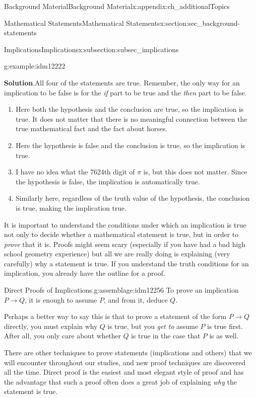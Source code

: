 \documentclass[oneside,10pt,]{book}
\numberwithin{equation}{chapter}
\def\imp{\rightarrow}
\begin{document}
\begin{appendixptx}{Background Material}{}{Background Material}{}{}{x:appendix:ch_additionalTopics}
\begin{sectionptx}{Mathematical Statements}{}{Mathematical Statements}{}{}{x:section:sec_background-statements}
\begin{subsectionptx}{Implications}{}{Implications}{}{}{x:subsection:subsec_implications}
\begin{example}{}{g:example:idm12222}
\begin{enumerate}
\end{enumerate}
%
\par\smallskip%
\noindent\textbf{Solution}.\hypertarget{g:solution:idm12240}{}\quad{}All four of the statements are true. Remember, the only way for an implication to be false is for the \emph{if} part to be true and the \emph{then} part to be false.%
\begin{enumerate}
\item{}Here both the hypothesis and the conclusion are true, so the implication is true. It does not matter that there is no meaningful connection between the true mathematical fact and the fact about horses.%
\item{}Here the hypothesis is false and the conclusion is true, so the implication is true.%
\item{}I have no idea what the 7624th digit of \(\pi\) is, but this does not matter. Since the hypothesis is false, the implication is automatically true.%
\item{}Similarly here, regardless of the truth value of the hypothesis, the conclusion is true, making the implication true.%
\end{enumerate}
%
\end{example}
It is important to understand the conditions under which an implication is true not only to decide whether a mathematical statement is true, but in order to \emph{prove} that it is. Proofs might seem scary (especially if you have had a bad high school geometry experience) but all we are really doing is explaining (very carefully) why a statement is true. If you understand the truth conditions for an implication, you already have the outline for a proof.%
\begin{assemblage}{Direct Proofs of Implications.}{g:assemblage:idm12256}%
To prove an implication \(P \imp Q\), it is enough to assume \(P\), and from it, deduce \(Q\).%
\end{assemblage}
Perhaps a better way to say this is that to prove a statement of the form \(P \imp Q\) directly, you must explain why \(Q\) is true, but you \emph{get to} assume \(P\) is true first.  After all, you only care about whether \(Q\) is true in the case that \(P\) is as well.%
\par
There are other techniques to prove statements (implications and others) that we will encounter throughout our studies, and new proof techniques are discovered all the time. Direct proof is the easiest and most elegant style of proof and has the advantage that such a proof often does a great job of explaining \emph{why} the statement is true.%

\end{subsectionptx}
\end{sectionptx}
\end{appendixptx}
\end{document}
